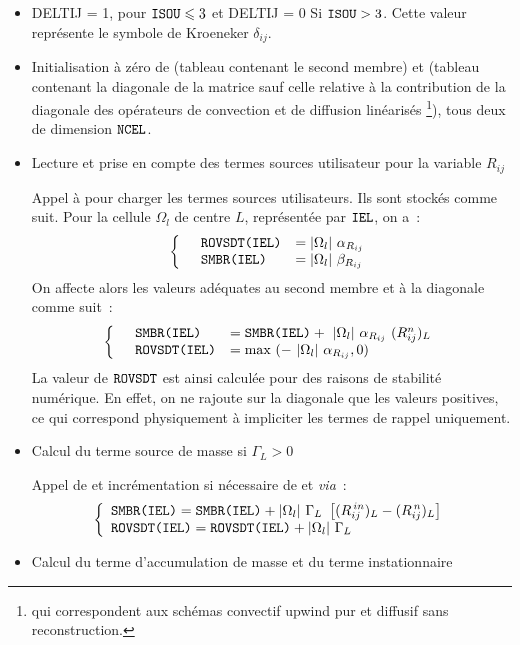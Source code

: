 \begin{itemize}

\item DELTIJ = 1, pour $\text{\texttt{ISOU}} \leqslant 3$ et DELTIJ = 0  Si $\text{\texttt{ISOU}} >
3$. Cette valeur représente le symbole de Kroeneker $\delta_{ij}$.

\item Initialisation à zéro de  (tableau contenant le second
membre) et  (tableau contenant la diagonale de la matrice sauf celle
relative à la contribution de la
diagonale des opérateurs de convection et de diffusion linéarisés
\footnote{qui correspondent aux schémas convectif upwind pur et diffusif sans
reconstruction.}), tous deux de dimension $\text{\texttt{NCEL}}$.

\item Lecture et prise en compte des termes sources utilisateur pour la variable $R_{ij}$

Appel à  pour charger les termes sources utilisateurs. Ils sont
stockés comme suit. Pour la cellule $\Omega_l$ de centre $L$, représentée par $\text{\texttt{IEL}}$, on a~:\\
\begin{equation}\notag
\left\{\begin{array}{lll}
&\text{\texttt{ROVSDT(IEL)}}&= |\Omega_l| \ \alpha_{R_{ij}}\\
&\text{\texttt{SMBR(IEL)}}&=|\Omega_l| \ \beta_{R_{ij}}\\
\end{array}\right.
\end{equation}
On affecte alors les valeurs adéquates au second membre  et à la
diagonale  comme suit~:
\begin{equation}\notag
\left\{\begin{array}{lll}
&\var{SMBR(IEL)} &= \var{SMBR(IEL)} +\ |\Omega_l| \ \alpha_{R_{ij}} \ (R^n_{ij})_L \\
&\var{ROVSDT(IEL)}&= \text{max }(-\ |\Omega_l| \ \alpha_{R_{ij}},0)\\
\end{array}\right.
\end{equation}
La valeur de $ \text{\texttt{ROVSDT}}$ est ainsi calculée pour des raisons de stabilité
numérique. En effet, on ne rajoute sur la diagonale que les valeurs positives,
ce qui correspond physiquement à impliciter les termes de rappel uniquement.
\item{Calcul du terme source de masse  si $\Gamma_L > 0$}

Appel de  et incrémentation si nécessaire de  et
 {\it via}~:\\
\begin{equation}\notag
\left\{\begin{array}{lll}
\displaystyle \var{SMBR(IEL)} = \var{SMBR(IEL)} + |\Omega_l| \ \Gamma_L \
\left[(R^{\,in}_{ij})_L - (R^{\,n}_{ij})_L \right] \\
\displaystyle \var{ROVSDT(IEL)}=\var{ROVSDT(IEL)} + |\Omega_l| \ \Gamma_L
\end{array}\right.
\end{equation}
\item Calcul du terme d'accumulation de masse et du terme instationnaire


\end{itemize}
